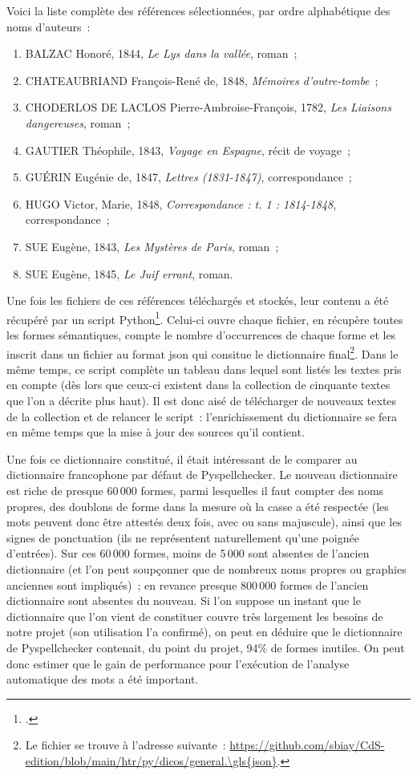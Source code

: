\documentclass[a4paper,12pt,twoside]{book}
\begin{document}
				Voici la liste complète des références sélectionnées, par ordre alphabétique des noms d'auteurs~:
				\begin{enumerate}
					\item BALZAC Honoré, 1844, \textit{Le Lys dans la vallée}, roman~;
					\item CHATEAUBRIAND François-René de, 1848, \textit{Mémoires d'outre-tombe}~;
					\item CHODERLOS DE LACLOS Pierre-Ambroise-François, 1782, \textit{Les Liaisons dangereuses}, roman~;
					\item GAUTIER Théophile, 1843, \textit{Voyage en Espagne}, récit de voyage~;
					\item GUÉRIN Eugénie de, 1847, \textit{Lettres (1831-1847)}, correspondance~;
					\item HUGO Victor, Marie, 1848, \textit{Correspondance : t. 1 : 1814-1848}, correspondance~;
					\item SUE Eugène, 1843, \textit{Les Mystères de Paris}, roman~;
					\item SUE Eugène, 1845, \textit{Le Juif errant}, roman.
				\end{enumerate}
			
				Une fois les fichiers de ces références téléchargés et stockés, leur contenu a été récupéré par un script Python\footcite{biayDictGenerateurPy2022}. Celui-ci ouvre chaque fichier, en récupère toutes les formes sémantiques, compte le nombre d'occurrences de chaque forme et les inscrit dans un fichier au format \gls{json} qui consitue le dictionnaire final\footnote{Le fichier se trouve à l'adresse suivante~: \url{https://github.com/sbiay/CdS-edition/blob/main/htr/py/dicos/general.\gls{json}}.}.
				Dans le même temps, ce script complète un tableau dans lequel sont listés les textes pris en compte (dès lors que ceux-ci existent dans la collection de cinquante textes que l'on a décrite plus haut). Il est donc aisé de télécharger de nouveaux textes de la collection et de relancer le script~: l'enrichissement du dictionnaire se fera en même temps que la mise à jour des sources qu'il contient.
				
				Une fois ce dictionnaire constitué, il était intéressant de le comparer au dictionnaire francophone par défaut de Pyspellchecker. Le nouveau dictionnaire est riche de presque 60\,000 formes, parmi lesquelles il faut compter des noms propres, des doublons de forme dans la mesure où la casse a été respectée (les mots peuvent donc être attestés deux fois, avec ou sans majuscule), ainsi que les signes de ponctuation (ils ne représentent naturellement qu'une poignée d'entrées).
				Sur ces 60\,000 formes, moins de 5\,000 sont absentes de l'ancien dictionnaire (et l'on peut soupçonner que de nombreux noms propres ou graphies anciennes sont impliqués)~; en revance presque 800\,000 formes de l'ancien dictionnaire sont absentes du nouveau. Si l'on suppose un instant que le dictionnaire que l'on vient de constituer couvre très largement les besoins de notre projet (son utilisation l'a confirmé), on peut en déduire que le dictionnaire de Pyspellchecker contenait, du point du projet, 94\% de formes inutiles. On peut donc estimer que le gain de performance pour l'exécution de l'analyse automatique des mots a été important.
				
\end{document}
